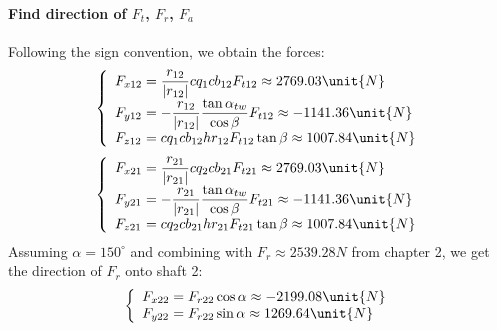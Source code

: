 \paragraph{Find direction of $ F_{t} $, $ F_r $, $ F_a $}
Following the sign convention, we obtain the forces:
\[
\left\{ 
\begin{array}{l@{{}={}}l}
F_{x12}& \dfrac{r_{12}}{|r_{12}|}cq_1cb_{12}F_{t12}\approx2769.03\unit{N}\\

F_{y12}& -\dfrac{r_{12}}{|r_{12}|}\dfrac{\tan\alpha_{tw}}{\cos\beta}F_{t12}\approx-1141.36\unit{N}\\

F_{z12}& cq_1cb_{12}hr_{12}F_{t12}\tan\beta\approx1007.84\unit{N}\\ 
\end{array}
\right.
\]
\[
\left\{ 
\begin{array}{l@{{}={}}l}
F_{x21}& \dfrac{r_{21}}{|r_{21}|}cq_2cb_{21}F_{t21}\approx2769.03\unit{N}\\

F_{y21}& -\dfrac{r_{21}}{|r_{21}|}\dfrac{\tan\alpha_{tw}}{\cos\beta}F_{t21}\approx-1141.36\unit{N}\\

F_{z21}& cq_2cb_{21}hr_{21}F_{t21}\tan\beta\approx1007.84\unit{N}\\ 
\end{array}
\right.
\]
Assuming $ \alpha = 150^\circ $ and combining with $ F_r \approx 2539.28\unit{N} $ from chapter 2, we get the direction of $ F_r $ onto shaft 2:
\[
\left\{ 
\begin{array}{l@{{}={}}l}
F_{x22}& F_{r22}\cos\alpha\approx-2199.08\unit{N}\\

F_{y22}& F_{r22}\sin\alpha\approx1269.64\unit{N}\\
\end{array}
\right.
\]

